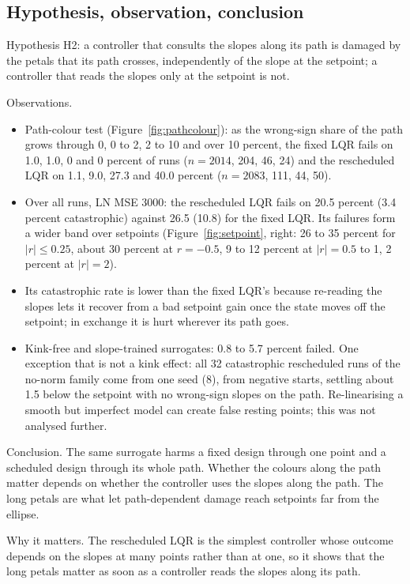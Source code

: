 \documentclass[11pt]{article}
\begin{document}
\subsection{Hypothesis, observation, conclusion}
Hypothesis H2: a controller that consults the slopes along its path is damaged by the petals that its path crosses, independently of the slope at the setpoint; a controller that reads the slopes only at the setpoint is not.

Observations.
\begin{itemize}
\item Path-colour test (Figure~\ref{fig:pathcolour}): as the wrong-sign share of the path grows through 0, 0 to 2, 2 to 10 and over 10 percent, the fixed LQR fails on 1.0, 1.0, 0 and 0 percent of runs ($n=2014$, 204, 46, 24) and the rescheduled LQR on 1.1, 9.0, 27.3 and 40.0 percent ($n=2083$, 111, 44, 50).
\item Over all runs, LN MSE 3000: the rescheduled LQR fails on 20.5 percent (3.4 percent catastrophic) against 26.5 (10.8) for the fixed LQR. Its failures form a wider band over setpoints (Figure~\ref{fig:setpoint}, right: 26 to 35 percent for $|r|\le0.25$, about 30 percent at $r=-0.5$, 9 to 12 percent at $|r|=0.5$ to 1, 2 percent at $|r|=2$).
\item Its catastrophic rate is lower than the fixed LQR's because re-reading the slopes lets it recover from a bad setpoint gain once the state moves off the setpoint; in exchange it is hurt wherever its path goes.
\item Kink-free and slope-trained surrogates: 0.8 to 5.7 percent failed. One exception that is not a kink effect: all 32 catastrophic rescheduled runs of the no-norm family come from one seed (8), from negative starts, settling about 1.5 below the setpoint with no wrong-sign slopes on the path. Re-linearising a smooth but imperfect model can create false resting points; this was not analysed further.
\end{itemize}
Conclusion. The same surrogate harms a fixed design through one point and a scheduled design through its whole path. Whether the colours along the path matter depends on whether the controller uses the slopes along the path. The long petals are what let path-dependent damage reach setpoints far from the ellipse.

Why it matters. The rescheduled LQR is the simplest controller whose outcome depends on the slopes at many points rather than at one, so it shows that the long petals matter as soon as a controller reads the slopes along its path.
\end{document}
